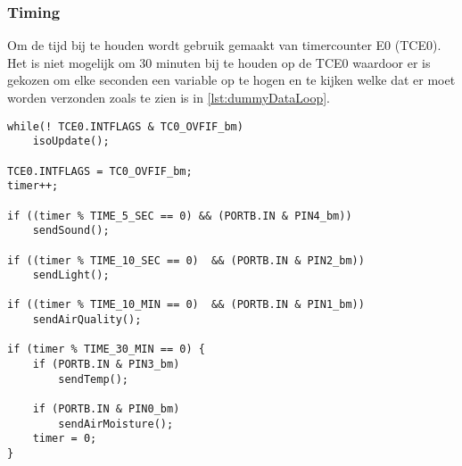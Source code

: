 \subsubsection{Timing}
Om de tijd bij te houden wordt gebruik gemaakt van timercounter E0 (TCE0). Het is niet mogelijk om 30 minuten bij te houden op de TCE0 waardoor er is gekozen om elke seconden een variable op te hogen en te kijken welke dat er moet worden verzonden zoals te zien is in \autoref{lst:dummyDataLoop}.
\begin{lstlisting}[caption={dummyData loop},captionpos=b,label={lst:dummyDataLoop},style=c]
while(! TCE0.INTFLAGS & TC0_OVFIF_bm)
    isoUpdate();

TCE0.INTFLAGS = TC0_OVFIF_bm;
timer++;

if ((timer % TIME_5_SEC == 0) && (PORTB.IN & PIN4_bm))
    sendSound();

if ((timer % TIME_10_SEC == 0)  && (PORTB.IN & PIN2_bm))
    sendLight();

if ((timer % TIME_10_MIN == 0)  && (PORTB.IN & PIN1_bm))
    sendAirQuality();

if (timer % TIME_30_MIN == 0) {
    if (PORTB.IN & PIN3_bm)
        sendTemp();
    
    if (PORTB.IN & PIN0_bm)
        sendAirMoisture();
    timer = 0;
}
\end{lstlisting}